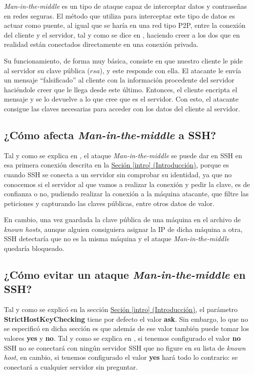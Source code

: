 \documentclass[10pt,a4paper,spanish]{article}
\begin{document}
\textit{Man-in-the-middle} es un tipo de ataque capaz de interceptar datos y contraseñas en redes seguras. El método que utiliza para interceptar este tipo de datos es actuar como puente, al igual que se haría en una red tipo P2P, entre la conexión del cliente y el servidor, tal y como se dice en \cite{mitmdef}, haciendo creer a los dos que en realidad están conectados directamente en una conexión privada.

Su funcionamiento, de forma muy básica, consiste en que nuestro cliente le pide al servidor su clave pública ($rsa$), y este responde con ella. El atacante le envía un mensaje ``falsificado'' al cliente con la información procedente del servidor haciéndole creer que le llega desde este último. Entonces, el cliente encripta el mensaje y se lo devuelve a lo que cree que es el servidor. Con esto, el atacante consigue las claves necesarias para acceder con los datos del cliente al servidor.


\subsection{¿Cómo afecta \textit{Man-in-the-middle} a SSH?}
Tal y como se explica en \cite{valenciano}, el ataque \textit{Man-in-the-middle} se puede dar en SSH en esa primera conexión descrita en la \hyperref[intro]{Seción \ref*{intro} (Introducción)}, porque es cuando SSH se conecta a un servidor sin comprobar su identidad, ya que no conocemos si el servidor al que vamos a realizar la conexión y pedir la clave, es de confianza o no, pudiendo realizar la conexión a la máquina atacante, que filtre las peticiones y capturando las claves públicas, entre otros datos de valor. 

En cambio, una vez guardada la clave pública de una máquina en el archivo de \textit{known hosts}, aunque alguien consiguiera asignar la IP de dicha máquina a otra, SSH detectaría que no es la misma máquina y el ataque \textit{Man-in-the-middle} quedaría bloqueado.

\subsection{¿Cómo evitar un ataque \textit{Man-in-the-middle} en SSH?}
Tal y como se explicó en la sección \hyperref[intro]{Seción \ref*{intro} (Introducción)}, el parámetro \textbf{StrictHostKeyChecking} tiene por defecto el valor \textbf{ask}. Sin embargo, lo que no se especificó en dicha sección es que además de ese valor también puede tomar los valores \textbf{yes} y \textbf{no}. Tal y como se explica en \cite{valenciano}, si tenemos configurado el valor \textbf{no} SSH no se conectará con ningún servidor SSH que no figure en su lista de \textit{known host}, en cambio, si tenemos configurado el valor \textbf{yes} hará todo lo contrario: se conectará a cualquier servidor sin preguntar.
\end{document}
